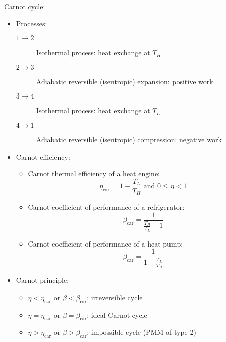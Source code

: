 \documentclass[10pt, twocolumn]{article}
\begin{document}
Carnot cycle:
\begin{itemize}
  \item Processes:
        \begin{description}
          \item[\(1 \rightarrow 2\)] Isothermal process: heat exchange at \(T_H \)
          \item[\(2 \rightarrow 3\)] Adiabatic reversible (isentropic) expansion: positive work
          \item[\(3 \rightarrow 4\)] Isothermal process: heat exchange at \(T_L \)
          \item[\(4 \rightarrow 1\)] Adiabatic reversible (isentropic) compression: negative work
        \end{description}
  \item Carnot efficiency:
        \begin{itemize}
          \item Carnot thermal efficiency of a heat engine:
                \[
                  \eta_{\mathrm{car}} = 1 - \frac{T_L }{T_H } \text{ and } 0 \leqslant \eta < 1
                \]
          \item Carnot coefficient of performance of a refrigerator:
                \[
                  \beta_{\mathrm{car}} = \frac{1}{\frac{T_H }{T_L } - 1}
                \]
          \item Carnot coefficient of performance of a heat pump:
                \[
                  \beta_{\mathrm{car}} = \frac{1}{1 - \frac{T_L }{T_H }}
                \]
        \end{itemize}
  \item Carnot principle:
        \begin{itemize}
          \item \(\eta < \eta_{\mathrm{car}} \text{ or } \beta < \beta_{\mathrm{car}}\): irreversible cycle
          \item \(\eta = \eta_{\mathrm{car}} \text{ or } \beta = \beta_{\mathrm{car}}\): ideal Carnot cycle
          \item \(\eta > \eta_{\mathrm{car}} \text{ or } \beta > \beta_{\mathrm{car}}\): impossible cycle (PMM of type 2)
        \end{itemize}
\end{itemize}
\end{document}
